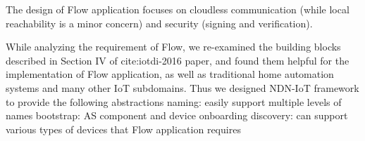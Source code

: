 The design of Flow application focuses on cloudless communication (while local reachability is a minor concern) and security (signing and verification).

While analyzing the requirement of Flow, we re-examined the building blocks described in Section IV of cite:iotdi-2016 paper, and found them helpful for the implementation of Flow application, as well as traditional home automation systems and many other IoT subdomains. 
Thus we designed NDN-IoT framework to provide the following abstractions
naming: easily support multiple levels of names
bootstrap: AS component and device onboarding
discovery: 
can support various types of devices that Flow application requires

